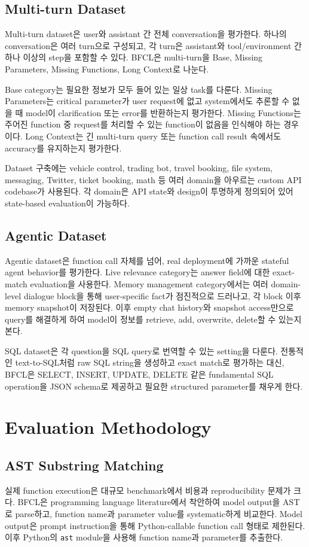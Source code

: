 \documentclass[11pt]{article}
\begin{document}
\subsection{Multi-turn Dataset}
Multi-turn dataset은 user와 assistant 간 전체 conversation을 평가한다. 하나의 conversation은 여러 turn으로 구성되고, 각 turn은 assistant와 tool/environment 간 하나 이상의 step을 포함할 수 있다. BFCL은 multi-turn을 Base, Missing Parameters, Missing Functions, Long Context로 나눈다.

Base category는 필요한 정보가 모두 들어 있는 일상 task를 다룬다. Missing Parameters는 critical parameter가 user request에 없고 system에서도 추론할 수 없을 때 model이 clarification 또는 error를 반환하는지 평가한다. Missing Functions는 주어진 function 중 request를 처리할 수 있는 function이 없음을 인식해야 하는 경우이다. Long Context는 긴 multi-turn query 또는 function call result 속에서도 accuracy를 유지하는지 평가한다.

Dataset 구축에는 vehicle control, trading bot, travel booking, file system, messaging, Twitter, ticket booking, math 등 여러 domain을 아우르는 custom API codebase가 사용된다. 각 domain은 API state와 design이 투명하게 정의되어 있어 state-based evaluation이 가능하다.

\subsection{Agentic Dataset}
Agentic dataset은 function call 자체를 넘어, real deployment에 가까운 stateful agent behavior를 평가한다. Live relevance category는 answer field에 대한 exact-match evaluation을 사용한다. Memory management category에서는 여러 domain-level dialogue block을 통해 user-specific fact가 점진적으로 드러나고, 각 block 이후 memory snapshot이 저장된다. 이후 empty chat history와 snapshot access만으로 query를 해결하게 하여 model이 정보를 retrieve, add, overwrite, delete할 수 있는지 본다.

SQL dataset은 각 question을 SQL query로 번역할 수 있는 setting을 다룬다. 전통적인 text-to-SQL처럼 raw SQL string을 생성하고 exact match로 평가하는 대신, BFCL은 SELECT, INSERT, UPDATE, DELETE 같은 fundamental SQL operation을 JSON schema로 제공하고 필요한 structured parameter를 채우게 한다.

\section{Evaluation Methodology}
\subsection{AST Substring Matching}
실제 function execution은 대규모 benchmark에서 비용과 reproducibility 문제가 크다. BFCL은 programming language literature에서 착안하여 model output을 AST로 parse하고, function name과 parameter value를 systematic하게 비교한다. Model output은 prompt instruction을 통해 Python-callable function call 형태로 제한된다. 이후 Python의 \texttt{ast} module을 사용해 function name과 parameter를 추출한다.
\end{document}
